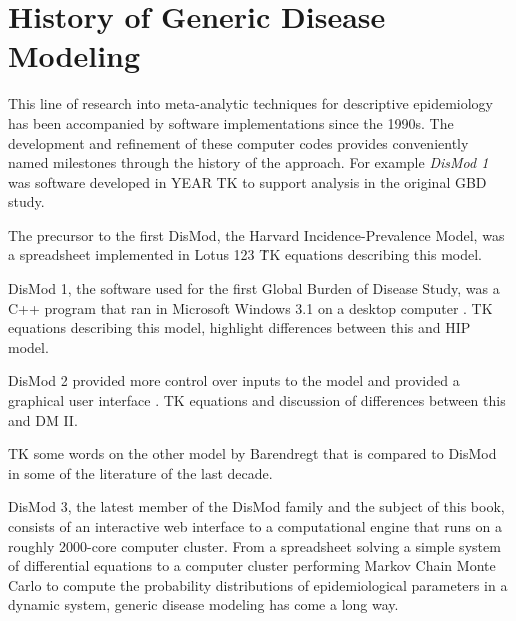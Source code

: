 \section{History of Generic Disease Modeling}

This line of research into meta-analytic techniques for descriptive
epidemiology has been accompanied by software implementations since
the 1990s.  The development and refinement of these computer codes
provides conveniently named milestones through the history of the
approach.  For example \emph{DisMod 1} was software developed in YEAR
TK to support analysis in the original GBD study.

The precursor to the first DisMod, the Harvard Incidence-Prevalence
Model, was a spreadsheet implemented in Lotus 123
\cite{Murray_Quantifying_1994}\.  TK equations describing this model.

DisMod 1, the software used for the first Global Burden of Disease
Study, was a C++ program that ran in Microsoft Windows 3.1 on a
desktop computer \cite{Harvard_Global_1996}. TK equations describing
this model, highlight differences between this and HIP model.

DisMod 2 provided more control over inputs to the model and provided a
graphical user interface \cite{Barendregt_Generic_2003}. TK equations
and discussion of differences between this and DM II.

TK some words on the other model by Barendregt that is compared to
DisMod in some of the literature of the last decade.

DisMod 3, the latest member of the DisMod family and the subject of
this book, consists of an interactive web interface to a computational
engine that runs on a roughly 2000-core computer cluster. From a
spreadsheet solving a simple system of differential equations to a
computer cluster performing Markov Chain Monte Carlo to compute the
probability distributions of epidemiological parameters in a dynamic
system, generic disease modeling has come a long way.

